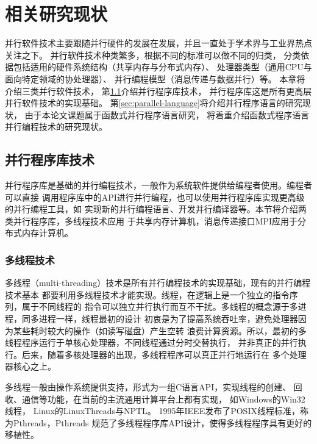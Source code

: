 \chapter{相关研究现状}
并行软件技术主要跟随并行硬件的发展在发展，并且一直处于学术界与工业界热点关注之下。
并行软件技术种类繁多，根据不同的标准可以做不同的归类，
分类依据包括适用的硬件系统结构（共享内存与分布式内存）、
处理器类型（通用CPU与面向特定领域的协处理器）、
并行编程模型（消息传递与数据并行）等。
本章将介绍三类并行软件技术，
第\ref{sec:parallel-library}介绍并行程序库技术，
并行程序库这是所有更高层并行软件技术的实现基础。
第\ref{sec:parallel-language}将介绍并行程序语言的研究现状，
由于本论文课题属于函数式并行程序语言研究，
将着重介绍函数式程序语言并行编程技术的研究现状。

\section{并行程序库技术}\label{sec:parallel-library}
并行程序库是基础的并行编程技术，一般作为系统软件提供给编程者使用。编程者可以直接
调用程序库中的API进行并行编程，也可以使用并行程序库实现更高级的并行编程工具，如
实现新的并行编程语言、开发并行编译器等。本节将介绍两类并行程序库，多线程技术应用
于共享内存计算机，消息传递接口MPI应用于分布式内存计算机。

\subsection{多线程技术}
多线程（multi-threading）技术是所有并行编程技术的实现基础，现有的并行编程技术基本
都要利用多线程技术才能实现。线程，在逻辑上是一个独立的指令序列，属于不同线程的
指令可以独立并行执行而互不干扰。多线程的概念源于多进程，同多进程一样，线程最初的设计
初衷是为了提高系统吞吐率，避免处理器因为某些耗时较大的操作（如读写磁盘）产生空转
浪费计算资源。所以，最初的多线程程序运行于单核心处理器，不同线程通过分时交替执行，
并非真正的并行执行。后来，随着多核处理器的出现，多线程程序可以真正并行地运行在
多个处理器核心之上。

多线程一般由操作系统提供支持，形式为一组C语言API，实现线程的创建、
回收、通信等功能，在当前的主流通用计算平台上都有实现，
如Windows的Win32线程，
Linux的LinuxThreads与NPTL。
1995年IEEE发布了POSIX线程标准，称为Pthreads，Pthreads
规范了多线程程序库API设计，使得多线程程序具有更好的移植性。

